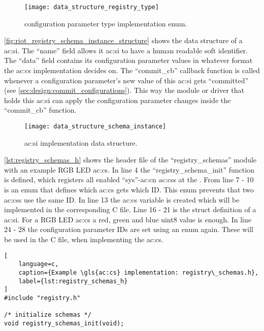 {\begin{figure}[H]
    \centering
    \texttt{[image: data\_structure\_registry\_type]}
    \caption{ configuration parameter type implementation enum.}
    \label{fig:riot_registry_configuration_parameter_type_enum}
\end{figure}

\autoref{fig:riot_registry_schema_instance_structure} shows the data structure of a \gls{ac:si}.
The ``name'' field allows it \gls{ac:si} to have a human readable soft identifier.
The ``data'' field contains its configuration parameter values in whatever format the \gls{ac:cs} implementation decides on.
The ``commit\_cb'' callback function is called whenever a configuration parameter's new value of this \gls{ac:si} gets ``committed'' (see \autoref{sec:design:commit_configurations}).
This way the module or driver that holds this \gls{ac:si} can apply the configuration parameter changes inside the ``commit\_cb'' function.


\begin{figure}[H]
    \centering
    \texttt{[image: data\_structure\_schema\_instance]}
    \caption{ \gls{ac:si} implementation data structure.}
    \label{fig:riot_registry_schema_instance_structure}
\end{figure}

\autoref{lst:registry_schemas_h} shows the header file of the ``registry\_schemas'' module with an example RGB LED \gls{ac:cs}.
In line 4 the ``registry\_schema\_init'' function is defined, which registers all enabled ``sys''-\gls{ac:cn} \glspl{ac:cs} at the .
From line 7 - 10 is an enum that defines which \gls{ac:cs} gets which ID.
This enum prevents that two \glspl{ac:cs} use the same ID.
In line 13 the \gls{ac:cs} variable is created which will be implemented in the corresponding C file.
Line 16 - 21 is the struct definition of a \gls{ac:si}. For a RGB LED \gls{ac:cs} a red, green and blue uint8 value is enough.
In line 24 - 28 the configuration parameter IDs are set using an enum again.
These will be used in the C file, when implementing the \gls{ac:cs}.

\begin{lstlisting}[
    language=c,
    caption={Example \gls{ac:cs} implementation: registry\_schemas.h},
    label={lst:registry_schemas_h}
]
#include "registry.h"

/* initialize schemas */
void registry_schemas_init(void);


\end{lstlisting}}
